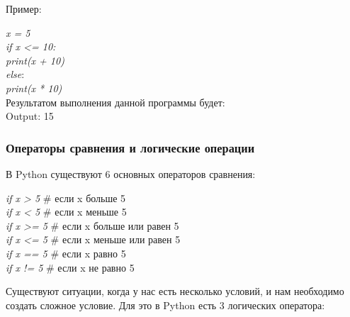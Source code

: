 Пример:

\begin{flushleft}
	\colorbox[rgb]{0.95, 0.95, 0.95}{\textit{x = 5}} \\
	\colorbox[rgb]{0.95, 0.95, 0.95}{\textit{if x <= 10:}} \\
	\colorbox[rgb]{0.95, 0.95, 0.95}{\hspace{1cm} \textit{print(x + 10)}} \\
	\colorbox[rgb]{0.95, 0.95, 0.95}{\textit{else}:} \\
	\colorbox[rgb]{0.95, 0.95, 0.95}{\hspace{1cm} \textit{print(x * 10)}} \\
	Результатом выполнения данной программы будет: \\
	\colorbox[rgb]{0.95, 0.95, 0.95}{Output: 15} \\
\end{flushleft}

\subsubsection{Операторы сравнения и логические операции}

В Python существуют 6 основных операторов сравнения:

\begin{flushleft}
	\colorbox[rgb]{0.95, 0.95, 0.95}{\textit{if x > 5} \hspace{1cm} \# если x больше 5} \\
	\colorbox[rgb]{0.95, 0.95, 0.95}{\textit{if x < 5} \hspace{1cm} \# если x меньше 5} \\
	\colorbox[rgb]{0.95, 0.95, 0.95}{\textit{if x >= 5} \hspace{0.7cm} \# если x больше или равен 5} \\
	\colorbox[rgb]{0.95, 0.95, 0.95}{\textit{if x <= 5} \hspace{0.7cm} \# если x меньше или равен 5} \\
	\colorbox[rgb]{0.95, 0.95, 0.95}{\textit{if x == 5} \hspace{0.7cm} \# если x равно 5} \\
	\colorbox[rgb]{0.95, 0.95, 0.95}{\textit{if x != 5} \hspace{0.9cm} \# если x не равно 5} \\
\end{flushleft}

Существуют ситуации, когда у нас есть несколько условий, и нам необходимо создать сложное условие. Для это в Python есть 3 логических оператора:

